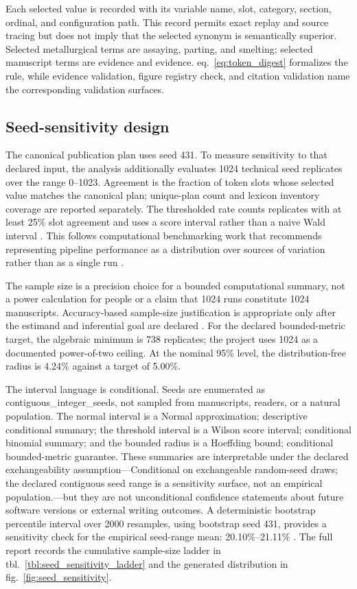 \documentclass[
  english,
]{article}
\begin{document}
Each selected value is recorded with its variable name, slot, category,
section, ordinal, and configuration path. This record permits exact
replay and source tracing but does not imply that the selected synonym
is semantically superior. Selected metallurgical terms are assaying,
parting, and smelting; selected manuscript terms are evidence and
evidence. eq.~\ref{eq:token_digest} formalizes the rule, while evidence
validation, figure registry check, and citation validation name the
corresponding validation surfaces.

\subsection{Seed-sensitivity design}\label{seed-sensitivity-design}

The canonical publication plan uses seed 431. To measure sensitivity to
that declared input, the analysis additionally evaluates 1024 technical
seed replicates over the range 0--1023. Agreement is the fraction of
token slots whose selected value matches the canonical plan; unique-plan
count and lexicon inventory coverage are reported separately. The
thresholded rate counts replicates with at least 25\% slot agreement and
uses a score interval rather than a naive Wald interval
\citep{newcombe1998proportion}. This follows computational benchmarking
work that recommends representing pipeline performance as a distribution
over sources of variation rather than as a single run
\citep{bouthillier2021accounting}.

The sample size is a precision choice for a bounded computational
summary, not a power calculation for people or a claim that 1024 runs
constitute 1024 manuscripts. Accuracy-based sample-size justification is
appropriate only after the estimand and inferential goal are declared
\citep{lakens2022samplesize}. For the declared bounded-metric target,
the algebraic minimum is 738 replicates; the project uses 1024 as a
documented power-of-two ceiling. At the nominal 95\% level, the
distribution-free radius is 4.24\% against a target of 5.00\%.

The interval language is conditional. Seeds are enumerated as
contiguous\_integer\_seeds, not sampled from manuscripts, readers, or a
natural population. The normal interval is a Normal approximation;
descriptive conditional summary; the threshold interval is a Wilson
score interval; conditional binomial summary; and the bounded radius is
a Hoeffding bound; conditional bounded-metric guarantee. These summaries
are interpretable under the declared exchangeability
assumption---Conditional on exchangeable random-seed draws; the declared
contiguous seed range is a sensitivity surface, not an empirical
population.---but they are not unconditional confidence statements about
future software versions or external writing outcomes. A deterministic
bootstrap percentile interval over 2000 resamples, using bootstrap seed
431, provides a sensitivity check for the empirical seed-range mean:
20.10\%--21.11\% \citep{efron1979bootstrap}. The full report records the
cumulative sample-size ladder in tbl.~\ref{tbl:seed_sensitivity_ladder}
and the generated distribution in fig.~\ref{fig:seed_sensitivity}.
\end{document}
